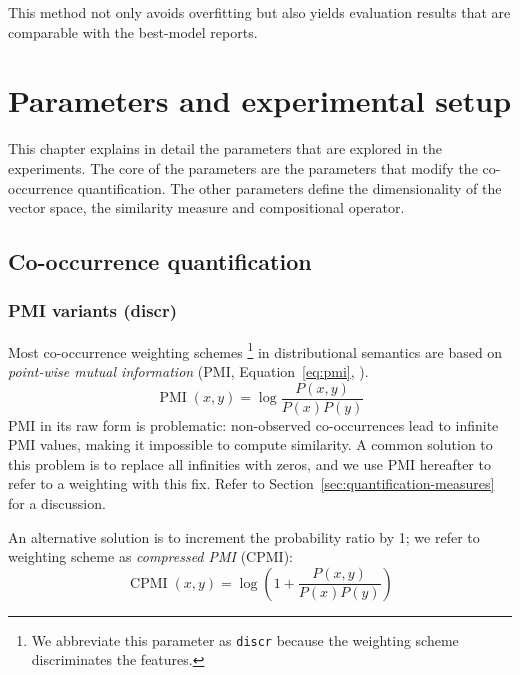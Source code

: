 This method not only avoids overfitting but also yields evaluation results that are comparable with the best-model reports.

\section{Parameters and experimental setup}
\label{sec:parameters}

This chapter explains in detail the parameters that are explored in the experiments. The core of the parameters are the parameters that modify the co-occurrence quantification. The other parameters define the dimensionality of the vector space, the similarity measure and compositional operator.
%
%

\subsection{Co-occurrence quantification}
\label{sec:quantification}

\subsubsection{PMI variants (discr)}
\label{sec:pmi-variants}

Most co-occurrence weighting schemes%
\footnote{We abbreviate this parameter as \texttt{discr} because the weighting scheme discriminates the features.
}
in distributional semantics are based on \emph{point-wise mutual information} (PMI, Equation~\ref{eq:pmi}, ).
%
\begin{equation}
  \label{eq:pmi}
  \operatorname{PMI}(x, y) = \log\frac{P(x,y)}{P(x)P(y)}
\end{equation}
%
PMI in its raw form is problematic: non-observed co-occurrences lead to infinite PMI values, making it impossible to compute similarity. A common solution to this problem is to replace all infinities with zeros, and we use PMI hereafter to refer to a weighting with this fix. Refer to Section~\ref{sec:quantification-measures} for a discussion.

An alternative solution is to increment the probability ratio by 1; we refer to weighting scheme as \emph{compressed PMI} (CPMI):
%
\begin{equation}
  \label{eq:cpmi}
  \operatorname{CPMI}(x, y) = \log\left( 1 +  \frac{P(x,y)}{P(x)P(y)} \right)
\end{equation}


